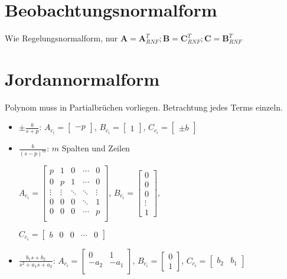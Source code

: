 \documentclass[11pt,a4paper,fleqn,headsepline]{scrreprt}
\begin{document}
\begin{multicols}{2}
        \section*{Beobachtungsnormalform}

        Wie Regelungsnormalform, nur \(\mathbf{A} = \mathbf{A}_{RNF}^T; \mathbf{B} = \mathbf{C}_{RNF}^T; \mathbf{C} = \mathbf{B}_{RNF}^T\)

        \section*{Jordannormalform}

        Polynom muss in Partialbrüchen vorliegen. Betrachtung jedes Terms einzeln.

        \begin{itemize}
            \item \(\pm \frac{b}{s+p}\): \(A_{c_i} = \begin{bmatrix}-p\end{bmatrix}\), \(B_{c_i} = \begin{bmatrix}1\end{bmatrix}\), \(C_{c_i} = \begin{bmatrix}\pm b\end{bmatrix}\)
            \item \(\frac{b}{{(s-p)}^m}\): \(m\) Spalten und Zeilen
            
            \(A_{c_i} = \begin{bmatrix}
                p & 1 & 0 & \cdots & 0 \\
                0 & p & 1 & \cdots & 0 \\
                \vdots & \vdots & \ddots & \ddots & \vdots \\
                0 & 0 & 0 & \ddots & 1 \\
                0 & 0 & 0 & \cdots & p \\
            \end{bmatrix}\), \(B_{c_i} = \begin{bmatrix}0 \\ 0 \\ 0 \\ \vdots \\ 1\end{bmatrix}\),
            
            \(C_{c_i} = \begin{bmatrix}b & 0 & 0 & \cdots & 0\end{bmatrix}\)
            \item \(\frac{b_1 s + b_2}{s^2 + a_1 s + a_2}\):  \(A_{c_i} = \begin{bmatrix}
                0 & 1 \\
                -a_2 & -a_1 \\
            \end{bmatrix}\), \(B_{c_i} = \begin{bmatrix}0 \\ 1\end{bmatrix}\), \(C_{c_i} = \begin{bmatrix}b_2 & b_1\end{bmatrix}\)
        \end{itemize}


\end{multicols}
\end{document}
